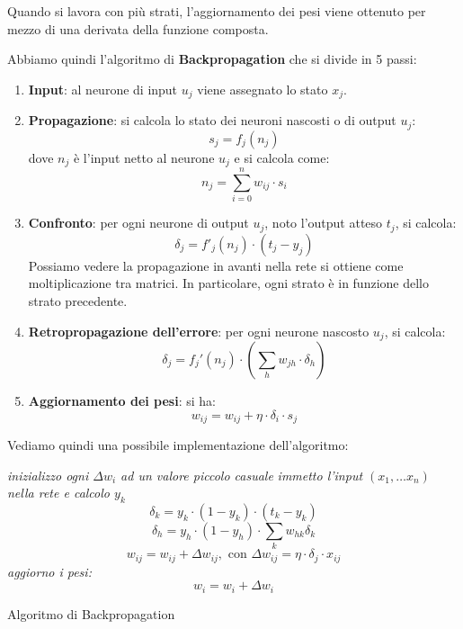 Quando si lavora con più strati, l'aggiornamento dei pesi viene ottenuto per mezzo di una derivata della funzione composta.

Abbiamo quindi l'algoritmo di \textbf{Backpropagation} che si divide in 5 passi:
\begin{enumerate}
    \item \textbf{Input}: al neurone di input $u_j$ viene assegnato lo stato $x_j$.
    \item \textbf{Propagazione}: si calcola lo stato dei neuroni nascosti o di output $u_j$:
    \begin{equation}
        s_j = f_j(n_j)
    \end{equation}
    dove $n_j$ è l'input netto al neurone $u_j$ e si calcola come:
    \begin{equation}
        n_j = \sum_{i = 0}^n w_{ij} \cdot s_i
    \end{equation}
    \item \textbf{Confronto}: per ogni neurone di output $u_j$, noto l'output atteso $t_j$, si calcola:
    \begin{equation}
        \delta_j = f'_j(n_j) \cdot (t_j - y_j)
    \end{equation}
    Possiamo vedere la propagazione in avanti nella rete si ottiene come moltiplicazione tra matrici. In particolare, ogni strato è in funzione dello strato precedente.
    \item \textbf{Retropropagazione dell'errore}: per ogni neurone nascosto $u_j$, si calcola: 
    \begin{equation}
        \delta_j = f_j'(n_j) \cdot \left( \sum_{h} w_{jh} \cdot \delta_h \right)
    \end{equation}
    \item \textbf{Aggiornamento dei pesi}: si ha:
    \begin{equation}
        w_{ij} = w_{ij} + \eta \cdot \delta_i \cdot s_j
    \end{equation}
\end{enumerate}

Vediamo quindi una possibile implementazione dell'algoritmo:
\begin{algorithm}[H]
  \begin{algorithmic}
    \State \textit{inizializzo ogni $\Delta w_i$ ad un valore piccolo casuale}
    \State \textit{immetto l'input $( x_1, \ldots x_n)$ nella rete e calcolo
    $y_k$}  
    \[\delta_k=y_k\cdot(1-y_k)\cdot(t_k-y_k)\]
    \EndFor
    \[\delta_h=y_h\cdot(1-y_h)\cdot\sum_k w_{hk}\delta_k\]
    \EndFor
    \[w_{ij}=w_{ij}+\Delta w_{ij},\mbox{ con } \Delta w_{ij}=\eta\cdot\delta_j\cdot x_{ij}\] 
    \EndFor
    \EndFor
    \EndWhile
    \State \textit{aggiorno i pesi:}
    \[w_i=w_i+\Delta w_i\]
    \EndFunction
  \end{algorithmic}
  \caption{Algoritmo di Backpropagation}
\end{algorithm}

